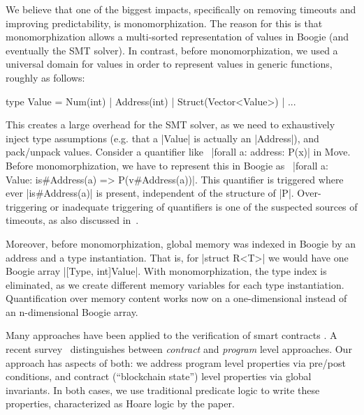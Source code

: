 We believe that one of the biggest impacts, specifically on
removing timeouts and improving predictability, is monomorphization. The
reason for this is that monomorphization allows a multi-sorted representation
of values in Boogie (and eventually the SMT solver). In contrast, before
monomorphization, we used a universal domain for values in order to represent
values in generic functions, roughly as follows:

\begin{Move}
  type Value = Num(int) | Address(int) | Struct(Vector<Value>) | ...
\end{Move}

\noindent This creates a large overhead for the SMT solver, as we need to
exhaustively inject type assumptions (e.g. that a |Value| is actually an
|Address|), and pack/unpack values. Consider a quantifier like~%
|forall a: address: P(x)| in Move. Before monomorphization, we have to represent
this in Boogie as~%
|forall a: Value: is#Address(a) => P(v#Address(a))|. This quantifier is
triggered where ever |is#Address(a)| is present, independent of the structure of
|P|. Over-triggering or inadequate triggering of quantifiers is one of the
suspected sources of timeouts, as also discussed in~\cite{BUTTERFLY}.

Moreover, before monomorphization, global memory was indexed in Boogie by an
address and a type instantiation. That is, for |struct R<T>| we would
have one Boogie array |[Type, int]Value|. With monomorphization, the type index
is eliminated, as we create different memory variables for each type
instantiation.  Quantification over memory content works now on a one-dimensional
instead of an n-dimensional Boogie array.


Many approaches have been applied to the verification of smart contracts
\cite{liu2019survey,miller2018smart,solcverify,DBLP:conf/esop/HajduJ20,verisol}.
A recent survey~\cite{CONTRACT_VERIFICATION} distinguishes between
\emph{contract} and \emph{program} level approaches. Our approach has aspects of
both: we address program level properties via pre/post conditions, and contract
(``blockchain state'') level properties via global invariants. In both cases, we
use traditional predicate logic to write these properties, characterized as
Hoare logic by the paper.

